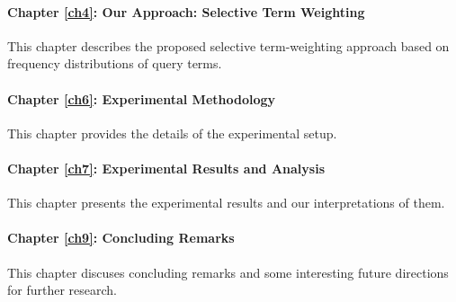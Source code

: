 \paragraph{Chapter \ref{ch4}: Our Approach: Selective Term Weighting}
This chapter describes the proposed selective term-weighting approach based on frequency distributions of query terms.

\paragraph{Chapter \ref{ch6}: Experimental Methodology}
This chapter provides the details of the experimental setup.

\paragraph{Chapter \ref{ch7}: Experimental Results and Analysis}
This chapter presents the experimental results and our interpretations of them.

\paragraph{Chapter \ref{ch9}: Concluding Remarks}
This chapter discuses concluding remarks and some interesting future directions for further research.



 